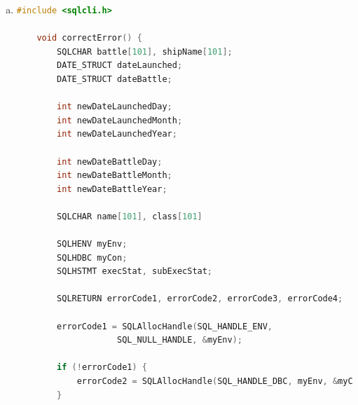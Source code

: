 \documentclass[12pt]{article}
\begin{document}
\begin{enumerate}[1.]
\begin{enumerate}[a)]
\begin{lstlisting}[language=c]
            if (shipName[0] == '\n') {
                strncpy(shipName, class, sizeof(class));
            }

            printf("Enter date launched (YYYY-MM-DD):\n");
            scanf("%s", dateLaunched);

            SQLPrepare(execStat,
                    "INSERT INTO Classes(class, type, country, numGuns, bore, displacement)"
                    "VALUES (?, ?, ?, ?, ?, ?)", SQL_NTS);
                SQLBindParameter(execStat, 1, ..., class, ...);
                SQLBindParameter(execStat, 2, ..., type, ...);
                SQLBindParameter(execStat, 3, ..., country, ...);
                SQLBindParameter(execStat, 4, ..., numGuns, ...);
                SQLBindParameter(execStat, 5, ..., bore, ...);
                SQLBindParameter(execStat, 6, ..., displacement, ...);
            SQLExecute(execStat);

            SQLPrepare(execStat,
                    "INSERT INTO Ships(name, class, launched)"
                    "VALUES (?, ?, ?)", SQL_NTS);
                SQLBindParameter(execStat, 1, ..., shipName, ...);
                SQLBindParameter(execStat, 2, ..., class, ...);
                SQLBindParameter(execStat, 3, ..., dateLaunched, ...);
            SQLExecute(execStat);
        }
    }
    \end{lstlisting}

        \item

    \begin{lstlisting}[language=c]
    #include <sqlcli.h>

    void correctError() {
        SQLCHAR battle[101], shipName[101];
        DATE_STRUCT dateLaunched;
        DATE_STRUCT dateBattle;

        int newDateLaunchedDay;
        int newDateLaunchedMonth;
        int newDateLaunchedYear;

        int newDateBattleDay;
        int newDateBattleMonth;
        int newDateBattleYear;

        SQLCHAR name[101], class[101]

        SQLHENV myEnv;
        SQLHDBC myCon;
        SQLHSTMT execStat, subExecStat;

        SQLRETURN errorCode1, errorCode2, errorCode3, errorCode4;

        errorCode1 = SQLAllocHandle(SQL_HANDLE_ENV,
                    SQL_NULL_HANDLE, &myEnv);

        if (!errorCode1) {
            errorCode2 = SQLAllocHandle(SQL_HANDLE_DBC, myEnv, &myCon);
        }


\end{lstlisting}
\end{enumerate}
\end{enumerate}
\end{document}
